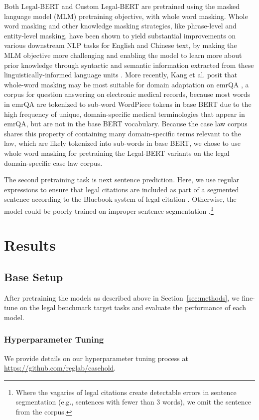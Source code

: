\documentclass[sigconf]{acmart}
\begin{document}
Both Legal-BERT and Custom Legal-BERT are pretrained using the masked language model (MLM) pretraining objective, with whole word masking. Whole word masking and other knowledge masking strategies, like phrase-level and entity-level masking, have been shown to yield substantial improvements on various downstream NLP tasks for English and Chinese text, by making the MLM objective more challenging and enabling the model to learn more about prior knowledge through syntactic and semantic information extracted from these linguistically-informed language units \cite{cui2019pretraining, joshi-etal-2020-spanbert, sun2019ernie}. More recently, Kang et al. \cite{kang-etal-2020-neural} posit that whole-word masking may be most suitable for domain adaptation on emrQA \cite{pampari-etal-2018-emrqa}, a corpus for question answering on electronic medical records, because most words in emrQA are tokenized to sub-word WordPiece tokens \cite{wu2016googles} in base BERT due to the high frequency of unique, domain-specific medical terminologies that appear in emrQA, but are not in the base BERT vocabulary. Because the case law corpus shares this property of containing many domain-specific terms relevant to the law, which are likely tokenized into sub-words in base BERT, we chose to use whole word masking for pretraining the Legal-BERT variants on the legal domain-specific case law corpus. 

The second pretraining task is next sentence prediction. Here, we use regular expressions to ensure that legal citations are included as part of a segmented sentence according to the Bluebook system of legal citation \cite{bluebook}. Otherwise, the model could be poorly trained on improper sentence segmentation \cite{savelka2017sentence}.\footnote{Where the vagaries of legal citations create detectable errors in sentence segmentation (e.g., sentences with fewer than 3 words), we omit the sentence from the corpus.}

\section{Results}
\subsection{Base Setup}
After pretraining the models as described above in Section~\ref{sec:methods}, we fine-tune on the legal benchmark target tasks and evaluate the performance of each model.

\subsubsection{Hyperparameter Tuning}
We provide details on our hyperparameter tuning process at \url{https://github.com/reglab/casehold}.
\end{document}
